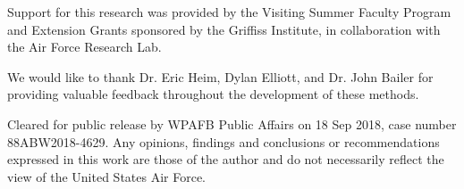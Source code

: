 \documentclass[10pt, conference]{IEEEtran}
\begin{document}
Support for this research was provided by the Visiting Summer Faculty Program and Extension Grants sponsored by the Griffiss Institute, in collaboration with the Air Force Research Lab. 

We would like to thank Dr. Eric Heim, Dylan Elliott, and Dr. John Bailer for providing valuable feedback throughout the development of these methods. 

Cleared for public release by WPAFB Public Affairs on 18 Sep 2018, case number 88ABW2018-4629.  Any opinions, findings and conclusions or recommendations expressed in this work are those of the author and do not necessarily reflect the view of the United States Air Force. \\



%
\end{document}
